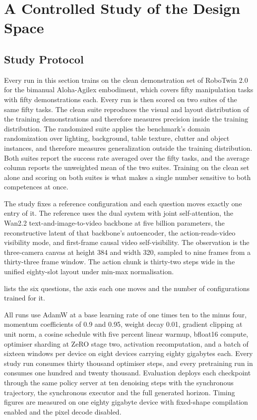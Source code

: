 \section{A Controlled Study of the Design Space}
\label{sec:study}

\subsection{Study Protocol}
\label{sec:protocol}

Every run in this section trains on the clean demonstration set of RoboTwin 2.0
\citep{chen2025robotwin2} for the bimanual Aloha-Agilex embodiment, which covers
fifty manipulation tasks with fifty demonstrations each. Every run is then scored
on two suites of the same fifty tasks. The clean suite reproduces the visual and
layout distribution of the training demonstrations and therefore measures
precision inside the training distribution. The randomized suite applies the
benchmark's domain randomization over lighting, background, table texture,
clutter and object instances, and therefore measures generalization outside the
training distribution. Both suites report the success rate averaged over the
fifty tasks, and the average column reports the unweighted mean of the two
suites. Training on the clean set alone and scoring on both suites is what makes
a single number sensitive to both competences at once.

The study fixes a reference configuration and each question moves exactly one
entry of it. The reference uses the dual system with joint self-attention, the
Wan2.2 text-and-image-to-video backbone at five billion parameters, the
reconstructive latent of that backbone's autoencoder, the action-reads-video
visibility mode, and first-frame causal video self-visibility. The observation is
the three-camera canvas at height 384 and width 320, sampled to nine frames from
a thirty-three frame window. The action chunk is thirty-two steps wide in the
unified eighty-slot layout under min-max normalisation.

 lists the six questions, the axis each one moves and the
number of configurations trained for it.

All runs use AdamW at a base learning rate of one times ten to the minus four,
momentum coefficients of 0.9 and 0.95, weight decay 0.01, gradient clipping at
unit norm, a cosine schedule with five percent linear warmup, bfloat16 compute,
optimiser sharding at ZeRO stage two, activation recomputation, and a batch of
sixteen windows per device on eight devices carrying eighty gigabytes each. Every
study run consumes thirty thousand optimiser steps, and every pretraining run in
 consumes one hundred and twenty thousand. Evaluation deploys each
checkpoint through the same policy server at ten denoising steps with the
synchronous trajectory, the synchronous executor and the full generated horizon.
Timing figures are measured on one eighty gigabyte device with fixed-shape
compilation enabled and the pixel decode disabled.

